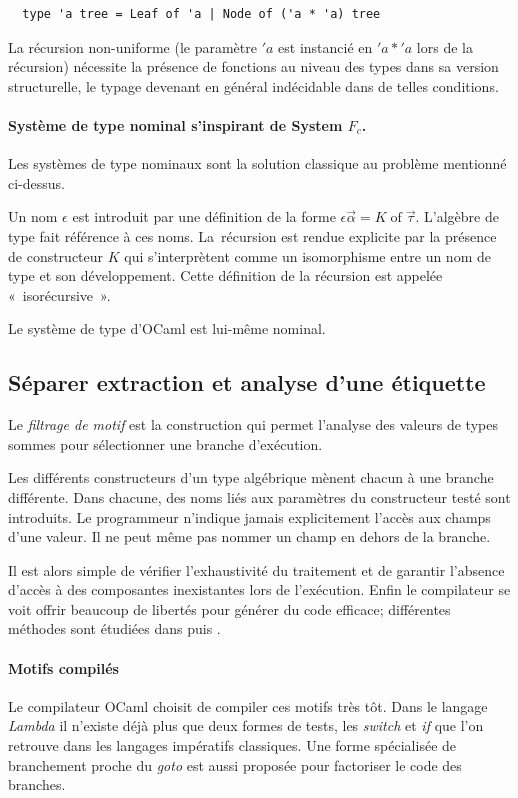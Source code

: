 \begin{lstlisting}
  type 'a tree = Leaf of 'a | Node of ('a * 'a) tree
\end{lstlisting}

La récursion non-uniforme (le paramètre $'a$ est instancié en $'a * 'a$ lors de
la récursion) nécessite la présence de fonctions au niveau des types dans sa
version structurelle, le typage devenant en général indécidable dans de telles
conditions.

\paragraph{Système de type nominal s'inspirant de System $F_c$.}
Les systèmes de type nominaux sont la solution classique au problème
mentionné ci-dessus. 

Un nom $\epsilon$ est introduit par une définition de la forme $\epsilon
\vec{\alpha} = K \operatorname{of} \vec{\tau}$.  L'algèbre de type fait
référence à ces noms. La récursion est rendue explicite par la présence de 
constructeur $K$ qui s'interprètent comme un isomorphisme entre un nom de type
et son développement.  Cette définition de la récursion est appelée
« isorécursive ».

Le système de type d'OCaml est lui-même nominal.

\subsection{Séparer extraction et analyse d'une étiquette}

Le \emph{filtrage de motif} est la construction qui permet l'analyse des
valeurs de types sommes pour sélectionner une branche d'exécution.

Les différents constructeurs d'un type algébrique mènent chacun à une branche
différente. Dans chacune, des noms liés aux paramètres du constructeur testé
sont introduits. Le programmeur n'indique jamais explicitement l'accès aux
champs d'une valeur. Il ne peut même pas nommer un champ en dehors de la
branche.

Il est alors simple de vérifier l'exhaustivité du traitement et de garantir
l'absence d'accès à des composantes inexistantes lors de l'exécution. Enfin le
compilateur se voit offrir beaucoup de libertés pour générer du code efficace;
différentes méthodes sont étudiées dans \cite{LeFessant:2001:OPM:507669.507641}
puis \cite{Maranget:2008:CPM:1411304.1411311}.

\paragraph{Motifs compilés} Le compilateur OCaml choisit de compiler ces motifs
très tôt. Dans le langage \emph{Lambda} il n'existe déjà plus que deux formes
de tests, les \emph{switch} et \emph{if} que l'on retrouve dans les langages
impératifs classiques. Une forme spécialisée de branchement proche du
\emph{goto} est aussi proposée pour factoriser le code des branches.

